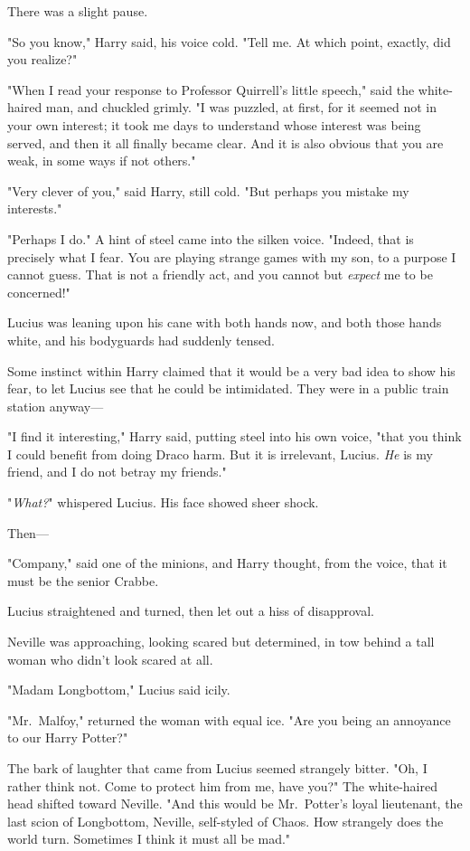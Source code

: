 There was a slight pause.

"So you know," Harry said, his voice cold. "Tell me. At which point, exactly, 
did you realize?"

"When I read your response to Professor Quirrell's little speech," said the 
white-haired man, and chuckled grimly. "I was puzzled, at first, for it seemed 
not in your own interest; it took me days to understand whose interest was 
being served, and then it all finally became clear. And it is also obvious that 
you are weak, in some ways if not others."

"Very clever of you," said Harry, still cold. "But perhaps you mistake my 
interests."

"Perhaps I do." A hint of steel came into the silken voice. "Indeed, that is 
precisely what I fear. You are playing strange games with my son, to a purpose 
I cannot guess. That is not a friendly act, and you cannot but \emph{expect} me 
to be concerned!"

Lucius was leaning upon his cane with both hands now, and both those hands 
white, and his bodyguards had suddenly tensed.

Some instinct within Harry claimed that it would be a very bad idea to show his 
fear, to let Lucius see that he could be intimidated. They were in a public 
train station anyway---

"I find it interesting," Harry said, putting steel into his own voice, "that 
you think I could benefit from doing Draco harm. But it is irrelevant, Lucius. 
\emph{He} is my friend, and I do not betray my friends."

"\emph{What?}" whispered Lucius. His face showed sheer shock.

Then---

"Company," said one of the minions, and Harry thought, from the voice, that it 
must be the senior Crabbe.

Lucius straightened and turned, then let out a hiss of disapproval.

Neville was approaching, looking scared but determined, in tow behind a tall 
woman who didn't look scared at all.

"Madam Longbottom," Lucius said icily.

"Mr.~Malfoy," returned the woman with equal ice. "Are you being an annoyance to 
our Harry Potter?"

The bark of laughter that came from Lucius seemed strangely bitter. "Oh, I 
rather think not. Come to protect him from me, have you?" The white-haired head 
shifted toward Neville. "And this would be Mr.~Potter's loyal lieutenant, the 
last scion of Longbottom, Neville, self-styled of Chaos. How strangely does the 
world turn. Sometimes I think it must all be mad."

